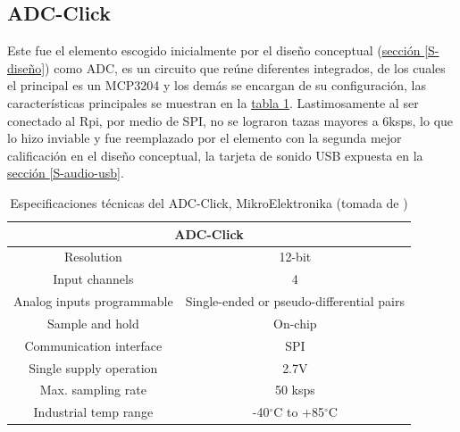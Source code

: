 \documentclass[11pt,lettersize]{article} %
\newcommand{\tabla}[1]{\hyperref[{#1}]{tabla \ref*{#1}}}
\newcommand{\seccion}[1]{\hyperref[{#1}]{sección \ref*{#1}}}
\begin{document}
\subsection{ADC-Click}
Este fue el elemento escogido inicialmente por el diseño conceptual (\seccion{S-diseño}) como ADC, es un circuito que reúne diferentes integrados, de los cuales el principal es un MCP3204 y los demás se encargan de su configuración, las características principales se muestran en la \tabla{T-adc-click}. Lastimosamente al ser conectado al Rpi, por medio de SPI, no se lograron tazas mayores a 6ksps, lo que lo hizo inviable y fue reemplazado por el elemento con la segunda mejor calificación en el diseño conceptual, la tarjeta de sonido USB expuesta en la \seccion{S-audio-usb}.
\begin{table}[H]
	\begin{center}
		\begin{tabular}{|c|c|}
			\hline
			\multicolumn{2}{|c|}{ADC-Click}\\ \hline
			Resolution & 12-bit \\ \hline
			Input channels & 4 \\ \hline
			Analog inputs programmable & Single-ended or pseudo-differential pairs \\ \hline
			Sample and hold & On-chip \\ \hline
			Communication interface & SPI \\ \hline
			Single supply operation & 2.7V \\ \hline
			Max. sampling rate & 50 ksps \\ \hline
			Industrial temp range & -40$^{\circ}$C to +85$^{\circ}$C \\ \hline
		\end{tabular}
	\end{center}
	\caption[Especificaciones técnicas del ADC-Click]{Especificaciones técnicas del ADC-Click, MikroElektronika (tomada de \cite{Microchip})}
	\label{T-adc-click}
\end{table}
\end{document}
